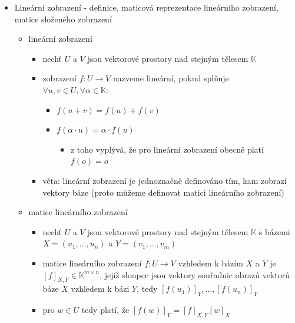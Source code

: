\begin{itemize}
\begin{itemize}
\begin{itemize}
\end{itemize}
\item jádro matice $A \in \mathbb K^{m\times n}$
\begin{itemize}
\item $\text{ker}(A) = \lbrace x \in \mathbb K^n: Ax=0\rbrace$
\end{itemize}
\item věta: $\forall A \in \mathbb K^{m\times n}:\text{dim}(\text{ker}(A))+\text{rank}(A)=n$
\item pozorování: dimenze řádkového a sloupcového prostoru se shodují (a rovnají se hodnosti)
\end{itemize}
\item Lineární zobrazení - definice, maticová reprezentace lineárního zobrazení, matice složeného zobrazení
\begin{itemize}
\item lineární zobrazení
\begin{itemize}
\item nechť $U$ a $V$ jsou vektorové prostory nad stejným tělesem $\mathbb K$
\item zobrazení $f:U\rightarrow V$ nazveme lineární, pokud splňuje $\forall u,v \in U, \forall \alpha \in \mathbb K:$
\begin{itemize}
\item $f(u+v)=f(u)+f(v)$
\item $f(\alpha\cdot u)=\alpha \cdot f(u)$
\begin{itemize}
\item z toho vyplývá, že pro lineární zobrazení obecně platí $f(o) = o$
\end{itemize}
\end{itemize}
\item věta: lineární zobrazení je jednoznačně definováno tím, kam zobrazí vektory báze (proto můžeme definovat matici lineárního zobrazení)
\end{itemize}
\item matice lineárního zobrazení
\begin{itemize}
\item nechť $U$ a $V$ jsou vektorové prostory nad stejným tělesem $\mathbb K$ s bázemi $X=(u_1,\dots,u_n)$ a $Y=(v_1,\dots,v_m)$
\item matice lineárního zobrazení $f:U\rightarrow V$ vzhledem k bázím $X$ a $Y$ je $[f]_{X,Y} \in \mathbb K^{m\times n}$, jejíž sloupce jsou vektory souřadnic obrazů vektorů báze $X$ vzhledem k bázi $Y$, tedy $[f(u_1)]_Y,\dots,[f(u_n)]_Y$
\item pro $w \in U$ tedy platí, že $[f(w)]_Y=[f]_{X,Y}[w]_X$

\end{itemize}
\end{itemize}
\end{itemize}
